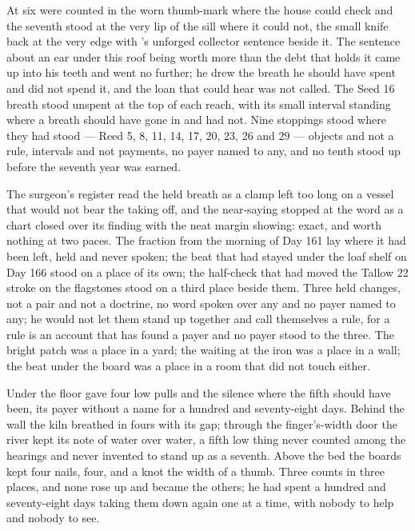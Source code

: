 At  six were counted in the worn thumb-mark where the house could check and the seventh stood at the very lip of the sill where it could not, the small knife back at the very edge with 's unforged collector sentence beside it. The sentence about an ear under this roof being worth more than the debt that holds it came up into his teeth and went no further; he drew the breath he should have spent and did not spend it, and the loan that could hear was not called. The Seed 16 breath stood unspent at the top of each reach, with its small interval standing where a breath should have gone in and had not. Nine stoppings stood where they had stood --- Reed 5, 8, 11, 14, 17, 20, 23, 26 and 29 --- objects and not a rule, intervals and not payments, no payer named to any, and no tenth stood up before the seventh year was earned.

The surgeon's register read the held breath as a clamp left too long on a vessel that would not bear the taking off, and the near-saying stopped at the word as a chart closed over its finding with the neat margin showing: exact, and worth nothing at two paces. The fraction from the morning of Day 161 lay where it had been left, held and never spoken; the beat that had stayed under the loaf shelf on Day 166 stood on a place of its own; the half-check that had moved the Tallow 22 stroke on the flagstones stood on a third place beside them. Three held changes, not a pair and not a doctrine, no word spoken over any and no payer named to any; he would not let them stand up together and call themselves a rule, for a rule is an account that has found a payer and no payer stood to the three. The bright patch was a place in a yard; the waiting at the iron was a place in a wall; the beat under the board was a place in a room that did not touch either.

\scenebreak

Under the floor  gave four low pulls and the silence where the fifth should have been, its payer without a name for a hundred and seventy-eight days. Behind the wall the kiln breathed in fours with its gap; through the finger's-width door the river kept its note of water over water, a fifth low thing never counted among the hearings and never invented to stand up as a seventh. Above the bed the boards kept four nails, four, and a knot the width of a thumb. Three counts in three places, and none rose up and became the others; he had spent a hundred and seventy-eight days taking them down again one at a time, with nobody to help and nobody to see.

